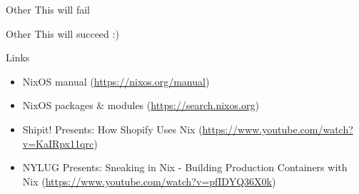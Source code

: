 \documentclass{beamer}
\begin{document}
\begin{frame}{Other}
	This will fail
	
\end{frame}

\begin{frame}{Other}
	This will succeed :)
	
\end{frame}

\begin{frame}{Links}
	\begin{itemize}
		\item NixOS manual (\url{https://nixos.org/manual})
		\item NixOS packages \& modules (\url{https://search.nixos.org})
		\item Shipit! Presents: How Shopify Uses Nix
		      (\url{https://www.youtube.com/watch?v=KaIRpx11qrc})
		\item NYLUG Presents: Sneaking in Nix - Building Production Containers
		      with Nix (\url{https://www.youtube.com/watch?v=pfIDYQ36X0k})
	\end{itemize}
\end{frame}
\end{document}
